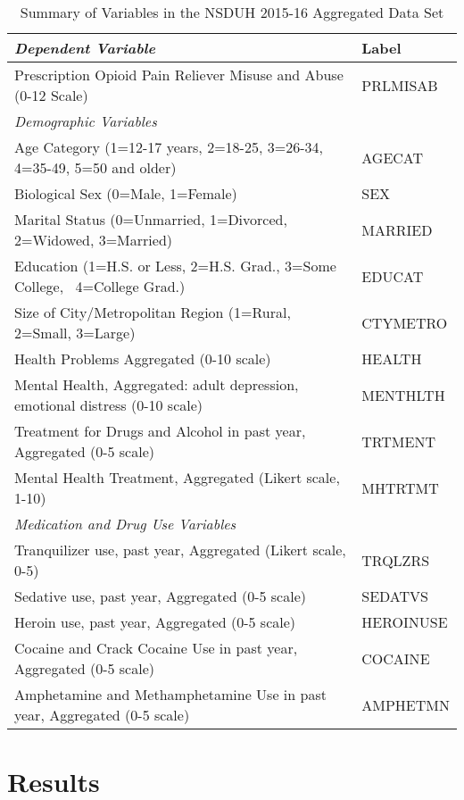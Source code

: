 \documentclass[sigconf]{acmart}
\begin{document}
\begin{table*}[ht]
  \caption{Summary of Variables in the NSDUH 2015-16 Aggregated Data Set}
  \label{tab:freq}
  \begin{tabular}{ll}
    \toprule
    \textit{Dependent Variable} & Label \\
    \midrule
    Prescription Opioid Pain Reliever Misuse and Abuse (0-12 Scale)& PRLMISAB  \\
    \midrule
    \textit{Demographic Variables}&   \\
    \midrule
    Age Category (1=12-17 years, 2=18-25, 3=26-34, 4=35-49, 5=50 and older)& AGECAT \\
    Biological Sex (0=Male, 1=Female)& SEX  \\
    Marital Status (0=Unmarried, 1=Divorced, 2=Widowed, 3=Married)& MARRIED  \\
    Education (1=H.S. or Less, 2=H.S. Grad., 3=Some College,  4=College Grad.)& EDUCAT  \\
    Size of City/Metropolitan Region (1=Rural, 2=Small, 3=Large)& CTYMETRO  \\
    Health Problems Aggregated  (0-10 scale)& HEALTH  \\
    Mental Health, Aggregated: adult depression, emotional distress (0-10 scale)& MENTHLTH  \\
    Treatment for Drugs and Alcohol in past year, Aggregated (0-5 scale)& TRTMENT  \\
    Mental Health Treatment, Aggregated (Likert scale, 1-10)& MHTRTMT  \\
    \midrule
    \textit{Medication and Drug Use Variables}& \\
    \midrule
    Tranquilizer use, past year, Aggregated (Likert scale, 0-5)& TRQLZRS \\
    Sedative use, past year, Aggregated (0-5 scale)& SEDATVS  \\
    Heroin use, past year, Aggregated (0-5 scale)& HEROINUSE  \\
    Cocaine and Crack Cocaine Use in past year, Aggregated  (0-5 scale)& COCAINE  \\
    Amphetamine and Methamphetamine Use in past year, Aggregated (0-5 scale)& AMPHETMN  \\
    \bottomrule
  \end{tabular}
\end{table*}

\section{Results}
\end{document}
